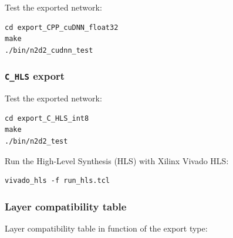 \documentclass[a4paper,11pt,oneside]{article}
\begin{document}
Test the exported network:
\begin{lstlisting}
cd export_CPP_cuDNN_float32
make
./bin/n2d2_cudnn_test
\end{lstlisting}

\subsubsection{\texorpdfstring{%
\lstinline[basicstyle=\ttfamily\bfseries]!C_HLS! export}
{C\_HLS export}}

Test the exported network:
\begin{lstlisting}
cd export_C_HLS_int8
make
./bin/n2d2_test
\end{lstlisting}

Run the High-Level Synthesis (HLS) with Xilinx\textregistered{}
Vivado\textregistered{} HLS:
\begin{lstlisting}
vivado_hls -f run_hls.tcl
\end{lstlisting}

\subsubsection{Layer compatibility table}

Layer compatibility table in function of the export type:
\end{document}
